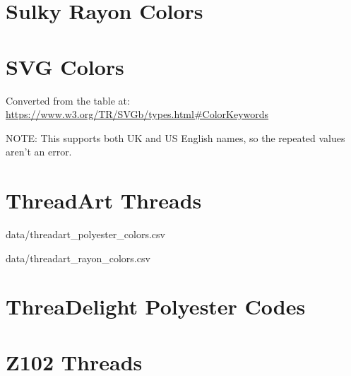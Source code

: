 
\section{Sulky Rayon Colors}


\section{SVG Colors}

Converted from the table at:
\url{https://www.w3.org/TR/SVGb/types.html#ColorKeywords}

NOTE: This supports both UK and US English names, so the repeated values aren't
an error.

\section{ThreadArt Threads}

%
{data/threadart_polyester_colors.csv}

%
{data/threadart_rayon_colors.csv}

\section{ThreaDelight Polyester Codes}

\section{Z102 Threads}


